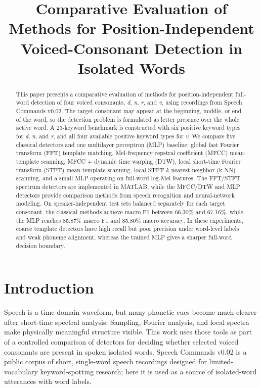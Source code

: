 \documentclass[conference]{IEEEtran}
\title{Comparative Evaluation of Methods for Position-Independent\\
Voiced-Consonant Detection in Isolated Words}
\author{\IEEEauthorblockN{Bunyod Suvonov and Giorgio Aman Soetomo}
\IEEEauthorblockA{Student IDs: 522370990020 and 523370990002}}
\begin{document}
\maketitle

\begin{abstract}
This paper presents a comparative evaluation of methods for position-independent full-word detection of four voiced consonants, \textit{d}, \textit{n}, \textit{r}, and \textit{v}, using recordings from Speech Commands v0.02. The target consonant may appear at the beginning, middle, or end of the word, so the detection problem is formulated as letter presence over the whole active word. A 23-keyword benchmark is constructed with six positive keyword types for \textit{d}, \textit{n}, and \textit{r}, and all four available positive keyword types for \textit{v}. We compare five classical detectors and one multilayer perceptron (MLP) baseline: global fast Fourier transform (FFT) template matching, Mel-frequency cepstral coefficient (MFCC) mean-template scanning, MFCC + dynamic time warping (DTW), local short-time Fourier transform (STFT) mean-template scanning, local STFT $k$-nearest-neighbor (k-NN) scanning, and a small MLP operating on full-word log-Mel features. The FFT/STFT spectrum detectors are implemented in MATLAB, while the MFCC/DTW and MLP detectors provide comparison methods from speech recognition and neural-network modeling. On speaker-independent test sets balanced separately for each target consonant, the classical methods achieve macro F1 between 66.30\% and 67.16\%, while the MLP reaches 85.87\% macro F1 and 85.80\% macro accuracy. In these experiments, coarse template detectors have high recall but poor precision under word-level labels and weak phoneme alignment, whereas the trained MLP gives a sharper full-word decision boundary.
\end{abstract}

\section{Introduction}
Speech is a time-domain waveform, but many phonetic cues become much clearer after short-time spectral analysis. Sampling, Fourier analysis, and local spectra make physically meaningful structure visible. This work uses those tools as part of a controlled comparison of detectors for deciding whether selected voiced consonants are present in spoken isolated words. Speech Commands v0.02 is a public corpus of short, single-word speech recordings designed for limited-vocabulary keyword-spotting research; here it is used as a source of isolated-word utterances with word labels.
\end{document}
